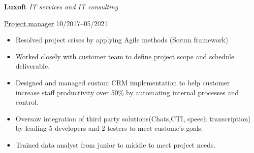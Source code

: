 \textbf{Luxoft} \textit{IT services and IT consulting} \par
\underline{Project manager} \hfill 10/2017--05/2021
\begin{itemize}
	\item Resolved project crises by applying Agile methods (Scrum framework)
 	\item Worked closely with customer team to define project scope and schedule deliverable.  
   	\item Designed and managed  custom CRM implementation to help customer increase staff productivity over 50\% by automating internal processes and control.
   	\item Oversaw integration of third party solutions(Chats,CTI, speech transcription) by leading  5 developers and 2 testers to meet custome's goals.
 	\item Trained data analyst from junior to middle to  meet  project needs.
\end{itemize}\par

